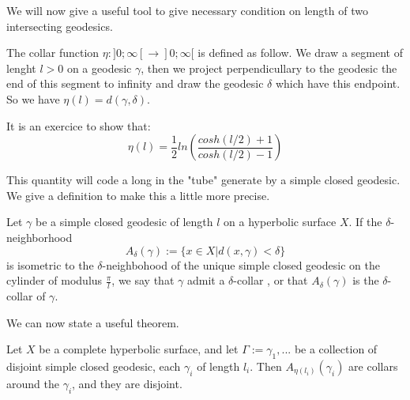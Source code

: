 We will now give a useful tool to give necessary condition on length of two intersecting geodesics.

The collar function $\eta:]0; \infty[ \to ]0;\infty[$ is defined as follow. We draw a segment of lenght $l > 0$ on a geodesic $\gamma$, then we project perpendicullary to the geodesic the end of this segment to infinity and draw the geodesic $\delta$ which have this endpoint. So we have $\eta(l)=d(\gamma,\delta)$.






It is an exercice to show that:\[
\eta(l)= \frac{1}{2} ln(\frac{cosh(l/2)+1}{cosh(l/2)-1})
\]

This quantity will code a long in the "tube" generate by a simple closed geodesic. We give a definition to make this a little more precise.

\begin{dfnt}
Let $\gamma$ be a simple closed geodesic of length $l$ on a hyperbolic surface $X$. If the $\delta$-neighborhood \[
A_\delta(\gamma):= \{ x \in X | d(x,\gamma) < \delta \}
\]
is isometric to the $\delta$-neighbohood of the unique simple closed geodesic on the cylinder of modulus $\frac{\pi}{l}$, we say that $\gamma$ admit a $\delta$-collar
, or that $A_\delta(\gamma)$ is the $\delta$-collar of $\gamma$.
\end{dfnt}

We can now state a useful theorem.

\begin{thm}
Let $X$ be a complete hyperbolic surface, and let $\Gamma:={\gamma_1,...}$ be a collection of disjoint simple closed geodesic, each $\gamma_i$ of length $l_i$. Then $A_{\eta(l_i)}(\gamma_i)$ are collars around the $\gamma_i$, and they are disjoint.
\end{thm}

